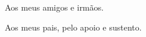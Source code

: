 \begin{dedicatoria}
    Aos meus amigos e irmãos.

    Aos meus pais, pelo apoio e sustento.
\end{dedicatoria}
